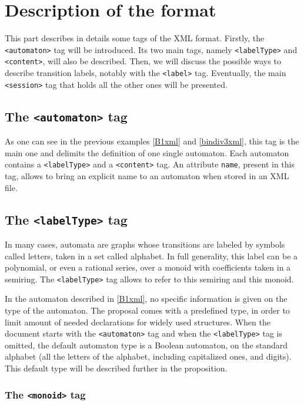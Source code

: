 \documentclass[a4paper]{article}
\newcommand{\xtag}[1]{\texttt{<#1>}}
\newcommand{\xattr}[1]{\texttt{#1}}
\begin{document}
\section{Description of the format}

This part describes in details some tags of the XML format.  Firstly,
the \xtag{automaton} tag will be introduced.
Its two main tags, namely \xtag{labelType} and \xtag{content}, will also be
described. Then, we will discuss the possible ways to describe transition
labels, notably with the \xtag{label} tag. Eventually, the main \xtag{session}
tag that holds all the other ones will be presented.

\subsection{The \xtag{automaton} tag}

As one can see in the previous examples \autoref{B1xml} and
\autoref{bindiv3xml}, this tag is the main one and delimits the definition of
one single automaton. Each automaton contains a \xtag{labelType} and a
\xtag{content} tag. An attribute \xattr{name}, present in this tag, allows to
bring an explicit name to an automaton when stored in an XML file.

\subsection{The \xtag{labelType} tag}

In many cases, automata are graphs whose transitions are labeled by
symbols called letters, taken in a set called alphabet. In full
generality, this label can be a polynomial, or even a rational series,
over a monoid with coefficients taken in a semiring. The \xtag{labelType}
tag allows to refer to this semiring and this monoid.

In the automaton described in \autoref{B1xml}, no specific information
is given on the type of the automaton. The proposal comes with a predefined
type, in order to limit amount of needed declarations
for widely used structures. When the document starts with the
\xtag{automaton} tag and when the \xtag{labelType} tag is omitted, the
default automaton type is a Boolean automaton, on the standard
alphabet (all the letters of the alphabet, including capitalized ones,
and digits). This default type will be described further in the proposition.

\subsubsection{The \xtag{monoid} tag}
\end{document}
